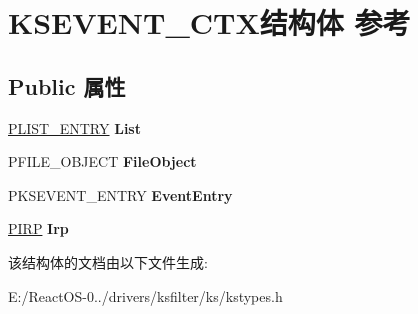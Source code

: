 \hypertarget{struct_k_s_e_v_e_n_t___c_t_x}{}\section{K\+S\+E\+V\+E\+N\+T\+\_\+\+C\+T\+X结构体 参考}
\label{struct_k_s_e_v_e_n_t___c_t_x}
\subsection*{Public 属性}
\begin{DoxyCompactItemize}
\item 
\mbox{\label{struct_k_s_e_v_e_n_t___c_t_x_ad284fe16aeb94308ffd0cb1fb5adf12c}} 
\hyperlink{struct___l_i_s_t___e_n_t_r_y}{P\+L\+I\+S\+T\+\_\+\+E\+N\+T\+RY} {\bfseries List}
\item 
\mbox{\label{struct_k_s_e_v_e_n_t___c_t_x_a09c783f1fb185ae67361513b3d3c5809}} 
P\+F\+I\+L\+E\+\_\+\+O\+B\+J\+E\+CT {\bfseries File\+Object}
\item 
\mbox{\label{struct_k_s_e_v_e_n_t___c_t_x_a3c7cdbe78edf3f09050d8596b05d6cdf}} 
P\+K\+S\+E\+V\+E\+N\+T\+\_\+\+E\+N\+T\+RY {\bfseries Event\+Entry}
\item 
\mbox{\label{struct_k_s_e_v_e_n_t___c_t_x_a15888ea525ef8b5212741e206f80cc5a}} 
\hyperlink{interfacevoid}{P\+I\+RP} {\bfseries Irp}
\end{DoxyCompactItemize}


该结构体的文档由以下文件生成\+:\begin{DoxyCompactItemize}
\item 
E\+:/\+React\+O\+S-\/0../drivers/ksfilter/ks/kstypes.\+h\end{DoxyCompactItemize}
